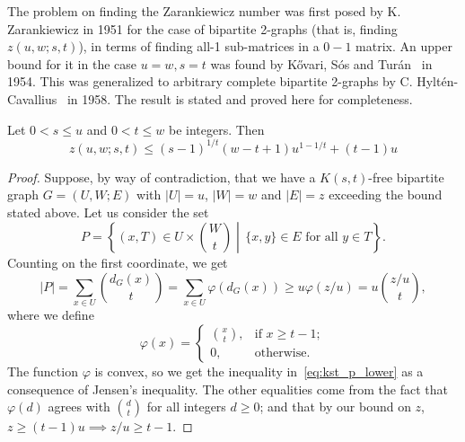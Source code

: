 The problem on finding the Zarankiewicz number was first posed by K. Zarankiewicz in 1951 for the
case of bipartite 2-graphs (that is, finding $z(u, w; s, t)$),
in terms of finding all-1 sub-matrices in a $0-1$ matrix.
An upper bound for it in the case $u=w, s=t$ was found by Kővari, Sós and Turán~\cite{Kovari1954} in 1954.
This was generalized to arbitrary complete
bipartite 2-graphs by C. Hyltén-Cavallius~\cite{Hylten1958} in 1958.
The result is stated and proved here for completeness.

\begin{theorem} \label{thm:kst}
    Let $0 < s \leq u$ and $0 < t \leq w$ be integers.
    Then 
    \[z(u, w; s, t) \leq (s - 1)^{1 / t}(w - t + 1)u^{1 - 1 / t} + (t - 1)u\]
    \begin{proof}
        Suppose, by way of contradiction, that we have a $K(s, t)$-free bipartite graph $G = (U, W; E)$
        with $|U| = u$, $|W| = w$ and $|E| = z$ exceeding the bound stated above.
        Let us consider the set
        \[
            P = \left\{ (x, T) \in U \times \binom{W}{t}
            \middle\vert\, \{x, y\} \in E \text{ for all } y \in T \right\}.
        \]
        Counting on the first coordinate, we get
        \begin{equation} \label{eq:kst_p_lower}
            |P| =
            \sum_{x \in U} \binom{d_G(x)}{t} =
            \sum_{x \in U} \varphi(d_G(x)) \geq
            u \varphi(z/u) =
            u \binom{z / u}{t},
        \end{equation}
        where we define
        \[
            \varphi(x) =
            \begin{cases}
                \binom{x}{t}, & \text{if } x \geq t - 1; \\
                0, & \text{otherwise.}
            \end{cases}
        \]
        The function $\varphi$ is convex, so we get the inequality in~\eqref{eq:kst_p_lower}
        as a consequence of Jensen's inequality.
        The other equalities come from the fact that $\varphi(d)$ agrees
        with $\binom{d}{t}$ for all integers $d \geq 0$;
        and that by our bound on $z$, $z \geq (t-1)u \implies z/u \geq t - 1$.


\end{proof}
\end{theorem}
